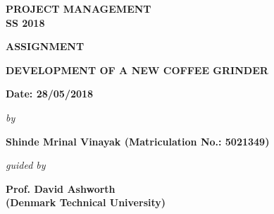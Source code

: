 \begin{center}
%
\begin{figure}[H]
{\centering {}\par}
\end{figure}
\vspace{0.2cm}
\begin{large}
\bfseries{PROJECT MANAGEMENT}\\
\vspace{1.1cm}
\bfseries{ SS 2018}\\
\end{large}
\vspace{1.5cm}

\bfseries{ASSIGNMENT}\\
\vspace{1.6cm}
\begin{Large}
{\bfseries DEVELOPMENT OF A NEW COFFEE GRINDER }\\
\end{Large}
\vspace{2.0cm}
{\bfseries Date: 28/05/2018 }\\
\vspace{1.5cm}
\begin{small}
\emph{by}\\
\end{small}
\vspace{0.4cm}
\bfseries{Shinde Mrinal Vinayak (Matriculation No.: 5021349)}\\
\vspace{2.2cm}
\begin{small}
\emph{guided by}\\
\end{small}
\vspace{0.3cm}
{\bfseries \large Prof. David Ashworth \\ (Denmark Technical University)} \\
\vspace{0.1cm}
\end{center}
